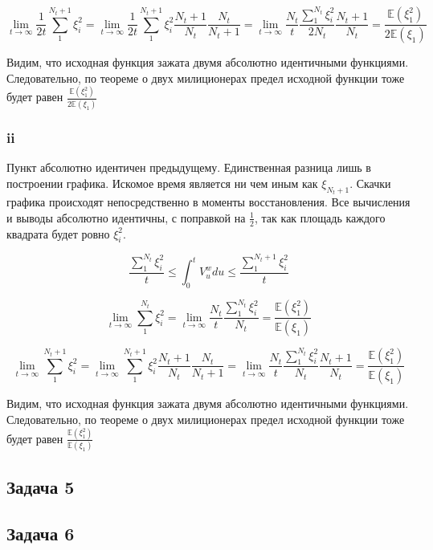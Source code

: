 \documentclass[a4paper,12pt]{article}
\def \mbb{\mathbb}
\def \E{\mbb{E}}
\begin{document}
\[ \lim\limits_{t \to \infty}\frac{1}{2t} \sum_{1}^{N_t + 1}\xi_i^2 = \lim\limits_{t \to \infty}\frac{1}{2t} \sum_{1}^{N_t + 1}\xi_i^2 \frac{N_t + 1}{N_t}  \frac{N_t}{N_t+1}= 
\lim\limits_{t \to \infty} \frac{N_t}{t}  \frac{\sum_{1}^{N_t}\xi_i^2 }{2 N_t} \frac{N_t + 1}{N_t} = \frac{\E(\xi_1^2)}{2 \E(\xi_1)} \]

Видим, что исходная функция зажата двумя абсолютно идентичными функциями. Следовательно, по теореме о двух милиционерах предел исходной функции тоже будет равен $ \frac{\E(\xi_1^2)}{2 \E(\xi_1)} $




\subsubsection{ii}

Пункт абсолютно идентичен предыдущему. Единственная разница лишь в построении графика. Искомое время является ни чем иным как $ \xi_{N_t+1} $. Скачки графика происходят непосредственно в моменты восстановления. Все вычисления и выводы абсолютно идентичны, с поправкой на $ \frac{1}{2} $, так как площадь каждого квадрата будет ровно $ \xi_i^2 $.


\[ \frac{\sum_{1}^{N_t}\xi_i^2}{t} \le \int_{0}^{t}V_u^{w} du\le \frac{\sum_{1}^{N_t + 1}\xi_i^2}{t} \]

\[ \lim\limits_{t \to \infty} \sum_{1}^{N_t}\xi_i^2 = \lim\limits_{t \to \infty} \frac{N_t}{t}  \frac{\sum_{1}^{N_t}\xi_i^2 }{N_t} = \frac{\E(\xi_1^2)}{\E(\xi_1)} \]

\[ \lim\limits_{t \to \infty} \sum_{1}^{N_t + 1}\xi_i^2 = \lim\limits_{t \to \infty} \sum_{1}^{N_t + 1}\xi_i^2 \frac{N_t + 1}{N_t}  \frac{N_t}{N_t+1}= 
\lim\limits_{t \to \infty} \frac{N_t}{t}  \frac{\sum_{1}^{N_t}\xi_i^2 }{ N_t} \frac{N_t + 1}{N_t} = \frac{\E(\xi_1^2)}{ \E(\xi_1)} \]

Видим, что исходная функция зажата двумя абсолютно идентичными функциями. Следовательно, по теореме о двух милиционерах предел исходной функции тоже будет равен $ \frac{\E(\xi_1^2)}{ \E(\xi_1)} $


\subsection{Задача 5}

\subsection{Задача 6}
\end{document}
